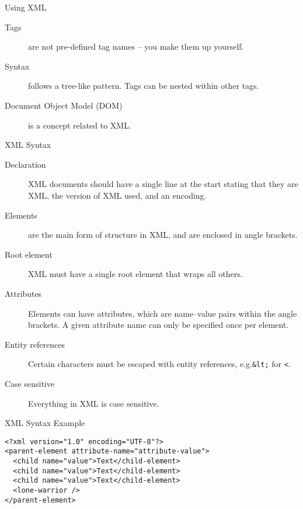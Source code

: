 \documentclass{beamer}
\begin{document}
\begin{frame}{Using XML}
  \begin{description}
    \item[Tags] are not pre-defined tag names -- you make them up yourself.
    \item[Syntax] follows a tree-like pattern. Tags can be nested within other tags.
    \item[Document Object Model (DOM)] is a concept related to XML.
  \end{description}
\end{frame}


\begin{frame}{XML Syntax}
  \begin{description}
    \item[Declaration] XML documents should have a single line at the start stating that they are XML, the version of XML used, and an encoding.
    \item[Elements] are the main form of structure in XML, and are enclosed in angle brackets.
    \item[Root element] XML must have a single root element that wraps all others.
    \item[Attributes] Elements can have attributes, which are name--value pairs within the angle brackets. A given attribute name can only be specified once per element.
    \item[Entity references] Certain characters must be escaped with entity references, e.g.\texttt{&lt;} for \texttt{<}.
    \item[Case sensitive] Everything in XML is case sensitive.
  \end{description}
\end{frame}

\begin{frame}[fragile]{XML Syntax Example}
  \begin{verbatim}
<?xml version="1.0" encoding="UTF-8"?>
<parent-element attribute-name="attribute-value">
  <child name="value">Text</child-element>
  <child name="value">Text</child-element>
  <child name="value">Text</child-element>
  <lone-warrior />
</parent-element>
  \end{verbatim}
\end{frame}
\end{document}
